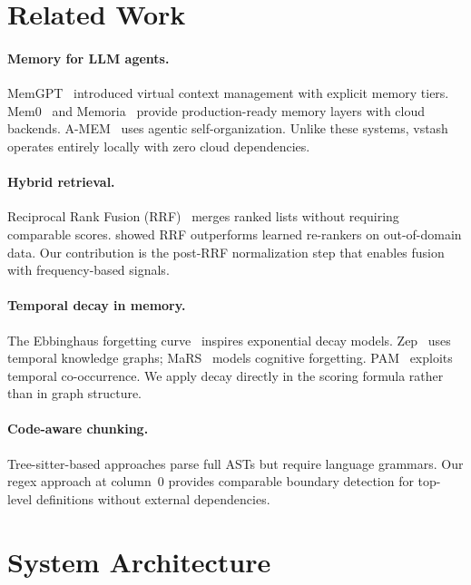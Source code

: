 \documentclass[11pt,a4paper]{article}
\begin{document}
\section{Related Work}
\label{sec:related}

\paragraph{Memory for LLM agents.}
MemGPT~\citep{packer2023memgpt} introduced virtual context management
with explicit memory tiers.  Mem0~\citep{chadha2025mem0} and
Memoria~\citep{memoria2025} provide production-ready memory layers with
cloud backends.  A-MEM~\citep{amem2025} uses agentic self-organization.
Unlike these systems, vstash operates entirely locally with zero cloud
dependencies.

\paragraph{Hybrid retrieval.}
Reciprocal Rank Fusion (RRF)~\citep{cormack2009rrf} merges ranked lists
without requiring comparable scores.  \citet{ma2024rrf} showed RRF
outperforms learned re-rankers on out-of-domain data.  Our contribution
is the post-RRF normalization step that enables fusion with
frequency-based signals.

\paragraph{Temporal decay in memory.}
The Ebbinghaus forgetting curve~\citep{ebbinghaus1885} inspires
exponential decay models.  Zep~\citep{zep2025} uses temporal knowledge
graphs; MaRS~\citep{mars2025} models cognitive forgetting.
PAM~\citep{pam2026} exploits temporal co-occurrence.  We apply decay
directly in the scoring formula rather than in graph structure.

\paragraph{Code-aware chunking.}
Tree-sitter-based approaches parse full ASTs but require language
grammars.  Our regex approach at column~0 provides comparable boundary
detection for top-level definitions without external dependencies.


\section{System Architecture}
\label{sec:system}
\end{document}
